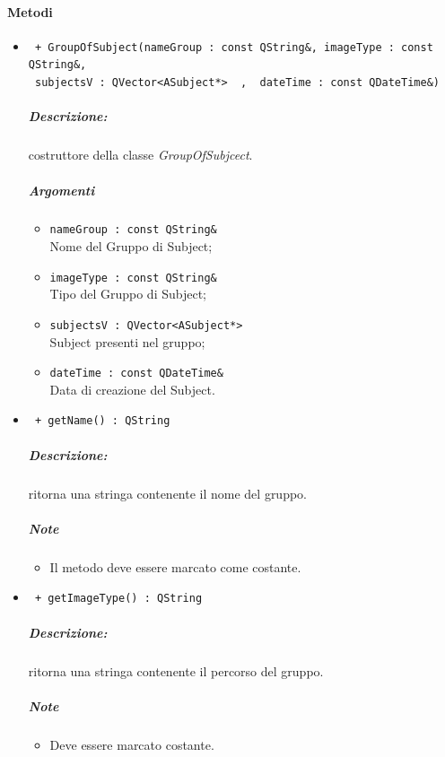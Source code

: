\paragraph{Metodi \\}
	\begin{itemize}
		\item \color{blue}\verb! + GroupOfSubject(nameGroup : const QString&, imageType : const QString&,!\\
									 \verb! subjectsV : QVector<ASubject*>  ,  dateTime : const QDateTime&)!\\
				\color{black}
					\subparagraph{Descrizione:} costruttore della classe \textsl{GroupOfSubjcect}.
					\subparagraph{Argomenti}
						\begin{itemize}
							\item \color{RoyalPurple}\verb!nameGroup : const QString&!\\
							\color{black}Nome del Gruppo di Subject\g{};
							
							\item \color{RoyalPurple}\verb!imageType : const QString&!\\
							\color{black}Tipo del Gruppo di Subject;
							
							\item \color{RoyalPurple}\verb!subjectsV : QVector<ASubject*>!\\
							\color{black}Subject\g{} presenti nel gruppo;
							
							\item \color{RoyalPurple}\verb!dateTime : const QDateTime&!\\
							\color{black}Data di creazione del Subject\g{}.
						\end{itemize}
						
		\item \color{blue}\verb! + getName() : QString !\\
		\color{black}
		\subparagraph{Descrizione:} ritorna una stringa contenente il nome del gruppo.
		\subparagraph{Note}
			\begin{itemize}
				\item Il metodo deve essere marcato come costante.
			\end{itemize}
			
		
		\item \color{blue}\verb! + getImageType() : QString !\\
		\color{black}
		\subparagraph{Descrizione:} ritorna una stringa contenente il percorso del gruppo.
		\subparagraph{Note}
			\begin{itemize}
				\item Deve essere marcato costante.
			\end{itemize}
			

\end{itemize}
